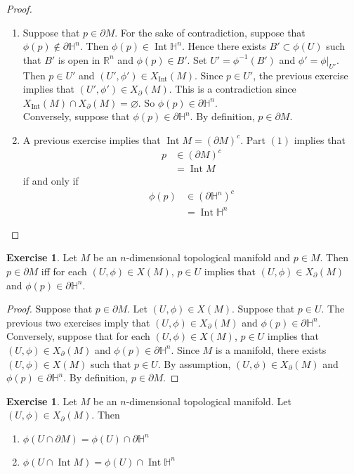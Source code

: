 \documentclass{book}
\theoremstyle{definition}
\newtheorem{ex}[definition]{Exercise}
\renewcommand{\H}{\mathbb{H}}
\newcommand{\R}{\mathbb{R}}
\DeclareMathOperator{\Int}{Int}
\DeclareMathOperator*{\0}{\mbf{0}}
\DeclareMathOperator*{\1}{\mbf{1}}
\newcommand{\p}{\partial}
\begin{document}
	\begin{proof}\
		\begin{enumerate}
			\item Suppose that $p \in \p M$. For the sake of contradiction, suppose that $\phi(p) \not \in \p \H^n$. Then $\phi(p) \in \Int \H^n$. Hence there exists $B' \subset \phi(U)$ such that $B'$ is open in $\R^n$ and $\phi(p) \in B'$. Set $U' = \phi^{-1}(B')$ and $\phi' = \phi|_{U'}$. Then $p \in U'$ and $(U', \phi') \in X_{\Int}(M)$. Since $p \in U'$, the previous exercise implies that $(U', \phi') \in X_{\p}(M)$. This is a contradiction since $X_{\Int}(M) \cap X_{\p}(M) = \varnothing$. So $\phi(p) \in \p \H^n$.\\
			Conversely, suppose that $\phi(p) \in \p \H^n$. By definition, $p \in \p M$.
			\item A previous exercise implies that $\Int M = (\p M)^c$. Part $(1)$ implies that 
			\begin{align*}
				p
				& \in (\p M)^c \\
				& = \Int M
			\end{align*}
			if and only if
			\begin{align*}
				\phi(p)
				& \in (\p \H^n)^c \\
				& = \Int \H^n
			\end{align*}
		\end{enumerate}
	\end{proof}

	\begin{ex}
		Let $M$ be an $n$-dimensional topological manifold and $p \in M$. Then $p \in \p M$ iff for each $(U, \phi) \in X(M)$, $p \in U$ implies that $(U, \phi) \in X_{\p}(M)$ and $\phi(p) \in \partial \H^n$. \\
	\end{ex}

	\begin{proof}
		Suppose that $p \in \partial M$. Let $(U, \phi) \in X(M)$. Suppose that $p \in U$. The previous two exercises imply that $(U, \phi) \in X_{\p}(M)$ and $\phi(p) \in \p \H^n$.\\
		Conversely, suppose that for each $(U, \phi) \in X(M)$, $p \in U$ implies that $(U, \phi) \in X_{\p}(M)$ and $\phi(p) \in \partial \H^n$. Since $M$ is a manifold, there exists $(U, \phi) \in X(M)$ such that $p \in U$. By assumption, $(U, \phi) \in X_{\p}(M)$ and $\phi(p) \in \p \H^n$. By definition, $p \in \p M$.
	\end{proof} 
	
	\begin{ex}
		Let $M$ be an $n$-dimensional topological manifold. Let $(U, \phi) \in X_{\p}(M)$. Then 
		\begin{enumerate}
			\item $\phi(U \cap \p M) = \phi(U) \cap \p \H^n$ 
			\item $\phi(U \cap \Int M) = \phi(U) \cap \Int \H^n$ 
		\end{enumerate}
	\end{ex}
\end{document}
